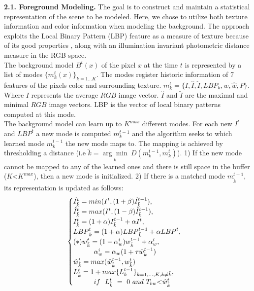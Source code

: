 \documentclass[10pt,letterpaper]{article}
\begin{document}
{\bf 2.1. Foreground Modeling.} The goal is to construct and maintain a statistical representation of the scene to be modeled. Here, we chose to utilize both texture information and color information when modeling the background. The approach \cite{odobez1} exploits the Local Binary Pattern (LBP) feature as a measure of texture because of its good properties \cite{Halika}, along with an illumination invariant photometric distance measure in the RGB space.\\
The background model ${{B}^{t}(x)}$ of the pixel $x$ at the time $t$ is represented by a list of modes $\{ {m}^{t}_{k}(x)\}_{k=1\dots K}$. The modes register historic information of 7 features of the pixels color and surrounding texture. ${m}^{t}_{k} = \{I ,\hat{I},\breve{I}, {LBP}_{k}, w,  \hat{w}, P \}$. Where ${I}$ represents the average $RGB$ image vector. $\hat{I}$ and $\breve{I}$ are the maximal and minimal $RGB$ image vectors. {LBP} is the vector of local binary patterns computed at this mode.\\
The background model can learn up to $K^{max}$ different modes. For each new $I^{t}$ and $LBP^{t}$ a new mode is computed $m^{t-1}_{k}$ and the algorithm seeks to which learned mode $m^{t-1}_{k}$ the new mode maps to. The mapping is achieved by thresholding a distance (i.e $\tilde{k} = \underset{{k}}{\arg\min} ~ D(m^{t-1}_{k},m^{t}_{k})$). 1) If the new mode cannot be mapped to any of the learned ones and there is still space in the buffer ($K $\textless$ K^{max}$), then a new mode is initialized. 2) If there is a matched mode $m^{t-1}_{\tilde{k}}$, its representation is updated as follows:
\begin{equation}
   \begin{cases} 
     \breve{I}_{\tilde{k}}^{t} = min (I^{t}, (1 + \beta) \breve{I}_{\tilde{k}}^{t-1}), \\
     \hat{I}_{\tilde{k}}^{t} = max (I^{t}, (1 - \beta) \hat{I}_{\tilde{k}}^{t-1}), \\
     {I}_{\tilde{k}}^{t} = (1 + \alpha) {I}_{\tilde{k}}^{t-1} + \alpha	{I}^{t}, \\
     {LBP}_{\tilde{k}}^{t} = (1 + \alpha) {LBP}_{\tilde{k}}^{t-1} + \alpha	{LBP}^{t}, \\
     (*)w^{t}_{\tilde k}= (1 - \alpha^{i}_{w}) {w}_{\tilde{k}}^{t-1} + \alpha^{i}_{w},\\ ~~~ ~~~ ~~~ \alpha^{i}_{w}=\alpha_{w}(1+\tau\hat{w}^{t-1}_{k}) \\
     \hat{w}^{t}_{\tilde{k}} = max (\hat{w}^{t-1}_{\tilde{k}}, w^{t}_{\tilde{k}})\\
     L^{t}_{\tilde{k}} = 1+ max \{L^{t-1}_{k}\}_{k=1,\dots,K, k \neq \tilde{k}},\\ ~~~ ~~~ ~~~ if~~ L^{t}_{\tilde{k}}~=~0~and~T_{bw} $\textless$\hat{w}_{\tilde{k}}^{t} \\
   \end{cases} 
\end{equation}
\end{document}
